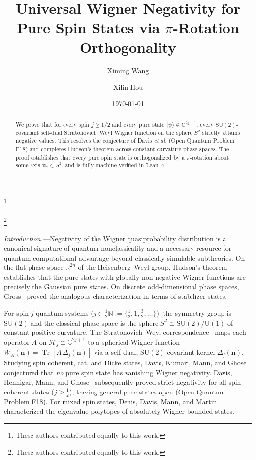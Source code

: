 \documentclass[aps,prl,reprint,amsmath,amssymb,nofootinbib,floatfix]{revtex4-2}
\newcommand{\ket}[1]{\lvert #1 \rangle}
\newcommand{\Tr}{\operatorname{Tr}}
\newcommand{\bn}{\mathbf{n}}
\newcommand{\bu}{\mathbf{u}}
\begin{document}
\title{Universal Wigner Negativity for Pure Spin States via \texorpdfstring{$\pi$}{pi}-Rotation Orthogonality}

\author{Ximing Wang}
\thanks{These authors contributed equally to this work.}

\author{Xilin Hou}
\thanks{These authors contributed equally to this work.}

\date{\today}

\begin{abstract}
We prove that for every spin $j \ge 1/2$ and every pure state $\ket{\psi} \in \mathbb{C}^{2j+1}$, every $\mathrm{SU}(2)$-covariant self-dual Stratonovich--Weyl Wigner function on the sphere $S^2$ strictly attains negative values. This resolves the conjecture of Davis \textit{et al.} (Open Quantum Problem F18) and completes Hudson's theorem across constant-curvature phase spaces. The proof establishes that every pure spin state is orthogonalized by a $\pi$-rotation about some axis $\bu_* \in S^2$, and is fully machine-verified in Lean~4.
\end{abstract}

\maketitle

\emph{Introduction.}---Negativity of the Wigner quasiprobability distribution is a canonical signature of quantum nonclassicality and a necessary resource for quantum computational advantage beyond classically simulable subtheories. On the flat phase space $\mathbb{R}^{2n}$ of the Heisenberg--Weyl group, Hudson's theorem~\cite{Hudson1974,SotoClaverie1983} establishes that the pure states with globally non-negative Wigner functions are precisely the Gaussian pure states. On discrete odd-dimensional phase spaces, Gross~\cite{Gross2006} proved the analogous characterization in terms of stabilizer states.

For spin-$j$ quantum systems ($j \in \frac{1}{2}\mathbb{N} := \{\frac{1}{2}, 1, \frac{3}{2}, \dots\}$), the symmetry group is $\mathrm{SU}(2)$ and the classical phase space is the sphere $S^2 \cong \mathrm{SU}(2)/\mathrm{U}(1)$ of constant positive curvature. The Stratonovich--Weyl correspondence~\cite{Stratonovich1957,VarillyGraciaBondia1989,BrifMann1999} maps each operator $A$ on $\mathcal{H}_j \cong \mathbb{C}^{2j+1}$ to a spherical Wigner function $W_A(\bn) = \Tr[A\,\Delta_j(\bn)]$ via a self-dual, $\mathrm{SU}(2)$-covariant kernel $\Delta_j(\bn)$. Studying spin coherent, cat, and Dicke states, Davis, Kumari, Mann, and Ghose~\cite{Davis2021} conjectured that \emph{no} pure spin state has vanishing Wigner negativity. Davis, Hennigar, Mann, and Ghose~\cite{Davis2023} subsequently proved strict negativity for all spin coherent states ($j \ge \frac{1}{2}$), leaving general pure states open (Open Quantum Problem F18). For mixed spin states, Denis, Davis, Mann, and Martin~\cite{Denis2024} characterized the eigenvalue polytopes of absolutely Wigner-bounded states.
\end{document}

